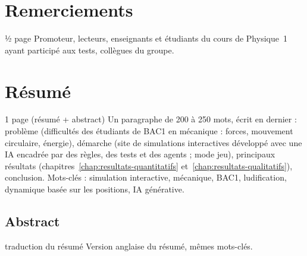 
\chapter*{Remerciements}

\begin{arediger}{½ page}
Promoteur, lecteurs, enseignants et étudiants du cours de Physique~1 ayant
participé aux tests, collègues du groupe.
\end{arediger}

\chapter*{Résumé}

\begin{arediger}{1 page (résumé + abstract)}
Un paragraphe de 200 à 250 mots, écrit en dernier : problème (difficultés des
étudiants de BAC1 en mécanique : forces, mouvement circulaire, énergie),
démarche (site de simulations interactives développé avec une IA encadrée par
des règles, des tests et des agents ; mode jeu), principaux résultats
(chapitres~\ref{chap:resultats-quantitatifs} et~\ref{chap:resultats-qualitatifs}),
conclusion. Mots-clés : simulation interactive, mécanique, BAC1, ludification,
dynamique basée sur les positions, IA générative.
\end{arediger}

\section*{Abstract}

\begin{arediger}{traduction du résumé}
Version anglaise du résumé, mêmes mots-clés.
\end{arediger}
